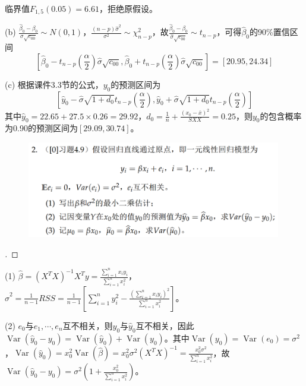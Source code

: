 \documentclass[cn,hazy,green,12pt,normal]{elegantnote}
\DeclareMathOperator{\Var}{Var}
\numberwithin{equation}{section}
\numberwithin{subsection}{section}
\begin{document}
临界值$F_{1,5}(0.05) = 6.61$，拒绝原假设。

(b) $\frac{\hat{\beta}_0-\beta_0}{\sigma \sqrt{c_{00}}} \sim N(0,1)$，$\frac{(n-p) \hat{\sigma}^2}{\sigma^2} \sim \chi^2_{n-p}$，故$\frac{\hat{\beta}_0-\beta_0}{\hat{\sigma} \sqrt{c_{00}}} \sim \mathit{t}_{n-p}$，可得$\hat{\beta}_0$的90\%置信区间
$$
\left[ \hat{\beta}_0-\mathit{t}_{n-p}(\frac{\alpha}{2})\hat{\sigma} \sqrt{c_{00}} , \hat{\beta}_0+\mathit{t}_{n-p}(\frac{\alpha}{2})\hat{\sigma} \sqrt{c_{00}} \right] = \left[ 20.95,24.34 \right]
$$

(c) 根据课件3.3节的公式，$y_0$的预测区间为
$$
\left[ \hat{y}_0-\hat{\sigma}\sqrt{1+d_0}\mathit{t}_{n-p}(\frac{\alpha}{2}),\hat{y}_0+\hat{\sigma}\sqrt{1+d_0}\mathit{t}_{n-p}(\frac{\alpha}{2}) \right]
$$
其中$\hat{y}_0=22.65+27.5\times0.26=29.92$，$d_0 = \frac{1}{n} + \frac{(x_0-\bar{x})^2}{SXX}=0.25$，则$y_0$的包含概率为0.90的预测区间为$\left[ 29.09,30.74 \right]$。


\newpage

\begin{homework}   
\end{homework}
\begin{figure}[!htbp]
    \centering
    \includegraphics[width=30em]{image/hw5_2.png}
\end{figure}

\begin{proof}[\solutionname]
\end{proof}

(1) $\hat{\beta} = (X^T X)^{-1} X^T y = \frac{\sum_{i=1}^n x_i y_i}{\sum_{i=1}^n x_i^2}$，$\hat{\sigma}^2 = \frac{1}{n-1} RSS = \frac{1}{n-1} \left[ \sum_{i=1}^n y_i^2 - \frac{(\sum_{i=1}^n x_i y_i)^2}{\sum_{i=1}^n x_i^2} \right] $。

(2) $e_0$与$e_1,\cdots,e_n$互不相关，则$y_0$与$\hat{y}_0$互不相关，因此$\Var(\hat{y}_0-y_0) = \Var(\hat{y}_0) + \Var(y_0)$。其中$\Var(y_0)=\Var(e_0)=\sigma^2$，$\Var(\hat{y}_0)=x_0^2\Var(\hat{\beta})=x_0^2\sigma^2(X^T X)^{-1}=\frac{x_0^2 \sigma^2}{\sum_{i=1}^n x_i^2}$，故$\Var(\hat{y}_0-y_0)=\sigma^2(1+\frac{x_0^2}{\sum_{i=1}^n x_i^2})$。
\end{document}
